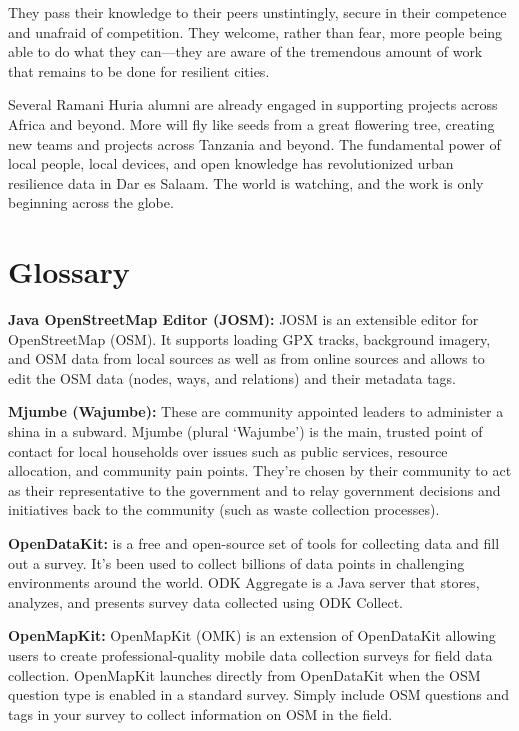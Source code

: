 \documentclass[a4paper,12pt,twoside]{article}
\begin{document}
\begin{multicols}{2}
They pass their knowledge to their peers unstintingly, secure in their competence and unafraid of competition. They welcome, rather than fear, more people being able to do what they can---they are aware of the tremendous amount of work that remains to be done for resilient cities. 

Several Ramani Huria alumni are already engaged in supporting projects across Africa and beyond. More will fly like seeds from a great flowering tree, creating new teams and projects across Tanzania and beyond. The fundamental power of local people, local devices, and open knowledge has revolutionized urban resilience data in Dar es Salaam. The world is watching, and the work is only beginning across the globe.


\end{multicols}

\newpage
\section{Glossary}

\textbf{Java OpenStreetMap Editor (JOSM):} JOSM is an extensible editor for ​OpenStreetMap (OSM). It supports loading GPX tracks, background imagery, and OSM data from local sources as well as from online sources and allows to edit the OSM data (nodes, ways, and relations) and their metadata tags.


\textbf{Mjumbe (Wajumbe):} These are community appointed leaders to administer a shina in a subward. Mjumbe (plural ‘Wajumbe’) is the main, trusted point of contact for local households over issues such as public services, resource allocation, and community pain points. They’re chosen by their community to act as their representative to the government and to relay government decisions and initiatives back to the community (such as waste collection processes).


\textbf {OpenDataKit:} is a free and open-source set of tools for collecting data and fill out a  survey. It's been used to collect billions of data points in challenging environments around the world. ODK Aggregate is a Java server that stores, analyzes, and presents survey data collected using ODK Collect.


\textbf{OpenMapKit:} OpenMapKit (OMK) is an extension of OpenDataKit allowing users to create professional-quality mobile data collection surveys for field data collection. OpenMapKit launches directly from OpenDataKit when the OSM question type is enabled in a standard survey. Simply include OSM questions and tags in your survey to collect information on OSM in the field.
\end{document}
